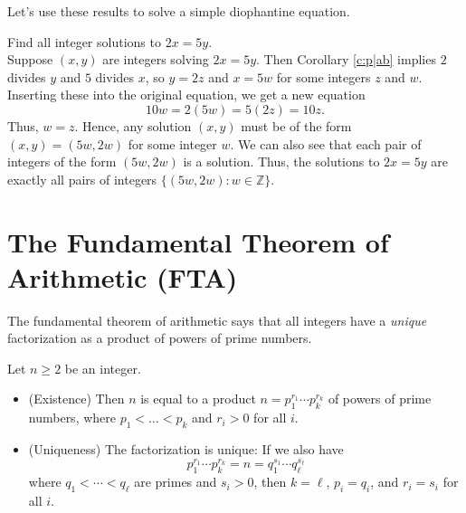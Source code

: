\documentclass[11pt,dvipsnames]{book}
\numberwithin{figure}{section} %
\numberwithin{table}{section} %
\begin{document}
 Let's use these results to solve a simple diophantine equation.

 \begin{example}
 \label{ex:2x=5y}
 Find all integer solutions to $2x=5y$. \\

 Suppose $(x,y)$ are integers solving $2x=5y$. Then Corollary \ref{c:p|ab} implies $2$ divides $y$ and $5$ divides $x$, so $y=2z$ and $x=5w$ for some integers $z$ and $w$. Inserting these into the original equation, we get a new equation
 \[
 10w = 2(5w)=5(2z) = 10z.
 \]
 Thus, $w=z$. Hence, any solution $(x,y)$ must be of the form $(x,y)=(5w,2w)$ for some integer $w$. We can also see that each pair of integers of the form $(5w,2w)$ is a solution. Thus, the solutions to $2x=5y$ are exactly all pairs of integers $\{(5w,2w) :  w\in\mathbb{Z}\}$.

 \end{example}

\section{The Fundamental Theorem of Arithmetic (FTA)}%
\label{fundamentaltheoremofarithmetic}

The fundamental theorem of arithmetic says that all integers have a \emph{unique} factorization as a product of powers of prime numbers.

\begin{theorem} \label{t:FTA} Let $n\geq 2$ be an integer.
\begin{itemize}
\item (Existence) Then $n$ is equal to a product $n=p_1^{r_{1}}\cdots p_k^{r_{k}}$ of powers of prime numbers, where $p_1< \ldots < p_k$ and $r_{i}>0$ for all $i$.
\item (Uniqueness) The factorization is unique: If we also have
$$ p_1^{r_{1}}\cdots p_k^{r_{k}} = n = q_1^{s_1}\cdots q_\ell^{s_{\ell}}$$
where  $q_{1}<\cdots < q_{\ell}$ are primes and $s_{i}> 0$, then $k=\ell$, $p_i=q_i$, and $r_{i}=s_{i}$ for all $i$.
\end{itemize}
\end{theorem}
\end{document}
